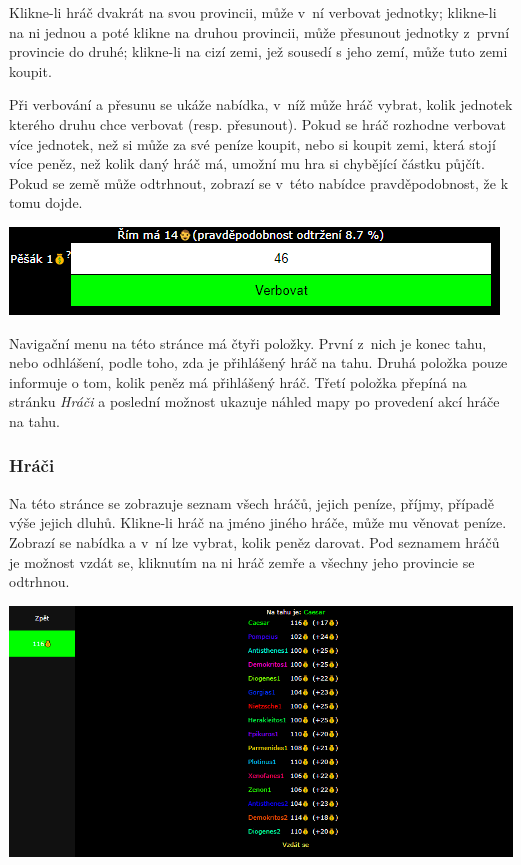 \documentclass[a4paper,12pt]{article}
\begin{document}
Klikne-li hráč dvakrát na svou provincii, může v~ní verbovat jednotky; klikne-li na ni jednou a poté klikne na druhou provincii, může přesunout jednotky z~první provincie do druhé; klikne-li na cizí zemi, jež sousedí s jeho zemí, může tuto zemi koupit.

Při verbování a přesunu se ukáže nabídka, v~níž může hráč vybrat, kolik jednotek kterého druhu chce verbovat (resp. přesunout). Pokud se hráč rozhodne verbovat více jednotek, než si může za své peníze koupit, nebo si koupit zemi, která stojí více peněz, než kolik daný hráč má, umožní mu hra si chybějící částku půjčít. Pokud se země může odtrhnout, zobrazí se v~této nabídce pravděpodobnost, že k tomu dojde.

\includegraphics[width=\textwidth]{Recruit.png}

Navigační menu na této stránce má čtyři položky. První z~nich je konec tahu, nebo odhlášení, podle toho, zda je přihlášený hráč na tahu. Druhá položka pouze informuje o tom, kolik peněz má přihlášený hráč. Třetí položka přepíná na stránku \textit{Hráči} a poslední možnost ukazuje náhled mapy po provedení akcí hráče na tahu.
\subsubsection{Hráči}
Na této stránce se zobrazuje seznam všech hráčů, jejich peníze, příjmy, případě výše jejich dluhů. Klikne-li hráč na jméno jiného hráče, může mu věnovat peníze. Zobrazí se nabídka a v~ní lze vybrat, kolik peněz darovat. Pod seznamem hráčů je možnost vzdát se, kliknutím na ni hráč zemře a všechny jeho provincie se odtrhnou.

\includegraphics[width=\textwidth]{Players.png}
\end{document}

